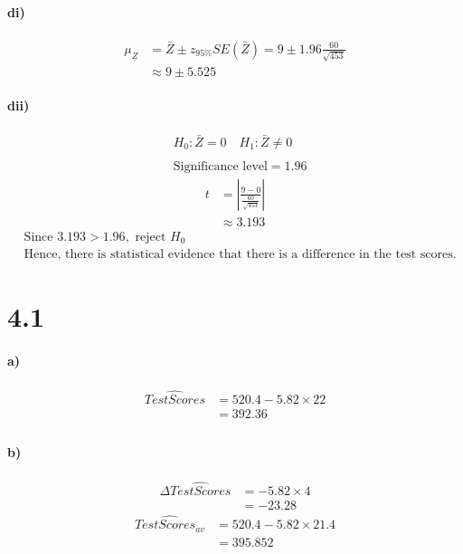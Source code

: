 \documentclass[letterpaper,12pt,titlepage,oneside,final]{book}
\begin{document}
\paragraph{di)}
\begin{align*}
\mu_Z& = \bar{Z}\pm z_{95\%}SE(\bar{Z})= 9\pm 1.96\frac{60}{\sqrt{453}}\\
&\approx 9\pm 5.525
\end{align*}

\paragraph{dii)}
\begin{align*}
&H_0: \bar{Z} = 0 \quad H_1: \bar{Z} \neq 0\\
\\
&\text{Significance level} = 1.96
\end{align*}
\begin{align*}
t&=\left| \frac{9-0}{\frac{60}{\sqrt{453}}}\right|\\
&\approx 3.193
\end{align*}
\begin{align*}
&\text{Since } 3.193 > 1.96, \text{ reject } H_0\\
&\text{Hence, there is statistical evidence that there is a difference in the test scores.}
\end{align*}


\section*{4.1}
\paragraph{a)}
\begin{align*}
\widehat{Test Scores} &= 520.4 - 5.82\times 22\\
&=392.36\\
\end{align*}
\paragraph{b)}
\begin{align*}
\Delta\widehat{Test Scores} &= -5.82\times 4\\
&= -23.28
\end{align*}
\begin{align*}
\widehat{Test Scores_{av}} &= 520.4 - 5.82\times 21.4\\
&=395.852\\
\end{align*}
\end{document}
